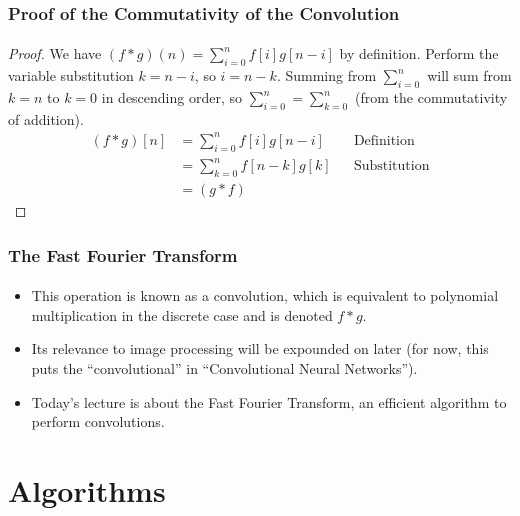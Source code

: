 \documentclass{beamer}                             %
\begin{document}
\begin{frame}
\frametitle{Proof of the Commutativity of the Convolution}
\framesubtitle{}
\begin{proof}
    We have \( (f * g)(n) = \sum^n_{i = 0} f[i]g[n - i] \) by definition.
Perform the variable substitution \( k = n - i \), so \( i = n - k \).
Summing from \( \sum^n_{i = 0} \) will sum from \( k = n \) to \( k = 0 \)
in descending order, so \( \sum^n_{i = 0} = \sum^n_{k = 0} \)
(from the commutativity of addition).
\begin{align*}
    (f * g)[n] &= \sum^n_{i = 0} f[i]g[n - i] && \text{Definition} \\
               &= \sum^n_{k = 0} f[n - k]g[k] && \text{Substitution} \\
               &= (g * f)
\end{align*}
\end{proof}
\end{frame}

\begin{frame}
\frametitle{The Fast Fourier Transform}
\framesubtitle{}
\begin{itemize}
  \item This operation is known as a \alert{convolution},
    which is equivalent to polynomial multiplication
    in the discrete case and is denoted \( f * g \).
  \item Its relevance to image processing will be expounded
    on later (for now, this puts the \enquote{convolutional}
    in \enquote{Convolutional Neural Networks}).
  \item Today's lecture is about the \alert{Fast Fourier Transform},
    an efficient algorithm to perform convolutions.
\end{itemize}
\end{frame}

\section{Algorithms}
\end{document}
